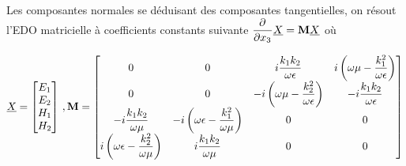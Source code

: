 Les composantes normales se déduisant des composantes tangentielles, on résout l'EDO matricielle à coefficients constants 
suivante $\dfrac{\partial^{{}} }{{\partial x_3}^{{}}}\underline{X} = \mathbf{M} \underline{X}$ où

\begin{equation}
    \underline{X} = 
    \begin{bmatrix}
    E_1 \\ 
    E_2 \\ 
    H_1 \\ 
    H_2 \\
    \end{bmatrix}\,,
    \mathbf{M} = \begin{bmatrix}
    0 & 0 & i\dfrac{k_1k_2}{\omega\epsilon} & i\left(\omega\mu - \dfrac{k_1^2}{\omega\epsilon}\right)\\
    0 & 0 & -i\left(\omega\mu - \dfrac{k_2^2}{\omega\epsilon}\right) & -i\dfrac{k_1k_2}{\omega\epsilon}\\
    -i\dfrac{k_1k_2}{\omega\mu} & -i\left(\omega\epsilon - \dfrac{k_1^2}{\omega\mu}\right) & 0 & 0 \\
    i\left(\omega\epsilon - \dfrac{k_2^2}{\omega\mu}\right) & i\dfrac{k_1k_2}{\omega\mu} & 0 & 0 \\
    \end{bmatrix}
\end{equation}

